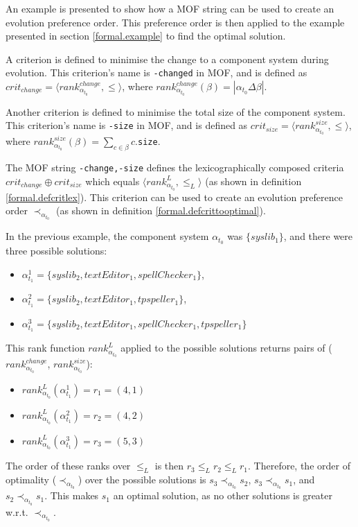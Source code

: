 An example is presented to show how a MOF string can be used to create an evolution preference order.
This preference order is then applied to the example presented in section \ref{formal.example} to find the optimal solution.

A criterion is defined to minimise the change to a component system during evolution.
This criterion's name is \texttt{-changed} in MOF,
and is defined as $crit_{change} = \langle rank^{change}_{\alpha_{t_{0}}}, \leq \rangle$,
where $rank^{change}_{\alpha_{t_{0}}}(\beta) = |\alpha_{t_{0}} \Delta \beta|$.

Another criterion is defined to minimise the total size of the component system.
This criterion's name is \texttt{-size} in MOF,
and is defined as $crit_{size} = \langle rank^{size}_{\alpha_{t_{0}}}, \leq  \rangle$,
where $rank^{size}_{\alpha_{t_{0}}}(\beta) = \sum_{c \in \beta} c$.\verb+size+.
 
The MOF string \texttt{-change,-size} defines the lexicographically composed criteria $crit_{change} \oplus crit_{size}$ 
which equals $\langle rank^{L}_{\alpha_{t_{0}}}, \leq_L \rangle$ (as shown in definition \ref{formal.defcritlex}).
This criterion can be used to create an evolution preference order $\prec_{\alpha_{t_{0}}}$ (as shown in definition \ref{formal.defcrittooptimal}).

In the previous example, the component system $\alpha_{t_{0}}$ was  $\{syslib_1\}$, and there were three possible solutions:
\begin{itemize}
  \item $\alpha_{t_1}^1 = \{syslib_2, textEditor_1, spellChecker_1\}$,
  \item $\alpha_{t_1}^2 = \{syslib_2, textEditor_1, tpspeller_1\}$,
  \item $\alpha_{t_1}^3 = \{syslib_2, textEditor_1, spellChecker_1, tpspeller_1\}$
\end{itemize}

This rank function $rank^{L}_{\alpha_{t_{0}}}$ applied to the possible solutions returns pairs of ($rank^{change}_{\alpha_{t_{0}}}$, $rank^{size}_{\alpha_{t_{0}}}$):
\begin{itemize}
  \item $rank^{L}_{\alpha_{t_{0}}}(\alpha_{t_1}^1 ) = r_1 = (4, 1)$
  \item $rank^{L}_{\alpha_{t_{0}}}(\alpha_{t_1}^2 ) = r_2 = (4, 2)$
  \item $rank^{L}_{\alpha_{t_{0}}}(\alpha_{t_1}^3 ) = r_3 = (5, 3)$
\end{itemize}
The order of these ranks over $\leq_L$ is then $r_3 \leq_L r_2 \leq_L r_1$.
Therefore, the order of optimality ($\prec_{\alpha_{t_{0}}}$) over the possible solutions is $s_3 \prec_{\alpha_{t_{0}}} s_2$, $s_3 \prec_{\alpha_{t_{0}}} s_1$, and $s_2 \prec_{\alpha_{t_{0}}} s_1$.
This makes $s_1$ an optimal solution, as no other solutions is greater w.r.t. $\prec_{\alpha_{t_{0}}}$. 

